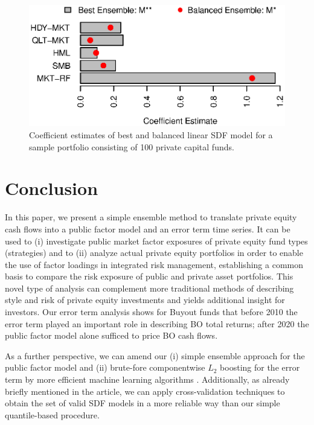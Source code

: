 \documentclass[12pt]{article}
\begin{document}
\begin{figure}[H]
	\centering
	\includegraphics{Figures/Coefs100Pofo}
	\caption{Coefficient estimates of best and balanced linear SDF model for a sample portfolio consisting of 100 private capital funds.}
	\label{fig:coef_barchart_100_pofo}
\end{figure}



\section{Conclusion}
\label{sec:conclusion}

In this paper, we present a simple ensemble method to translate private equity cash flows into a public factor model and an error term time series. 
It can be used to (i) investigate public market factor exposures of private equity fund types (strategies) and to (ii) analyze actual private equity portfolios in order to enable the use of factor loadings in integrated risk management, establishing a common basis to compare the risk exposure of public and private asset portfolios. 
This novel type of analysis can complement more traditional methods of describing style and risk of private equity investments and yields additional insight for investors.
Our error term analysis shows for Buyout funds that before 2010 the error term played an important role in describing BO total returns; after 2020 the public factor model alone sufficed to price BO cash flows.
 
As a further perspective, we can amend our (i) simple ensemble approach for the public factor model and (ii) brute-fore componentwise $L_2$ boosting for the error term by more efficient machine learning algorithms \citep{B12}.
Additionally, as already briefly mentioned in the article, we can apply cross-validation techniques to obtain the set of valid SDF models in a more reliable way than our simple quantile-based procedure.






\end{document}
